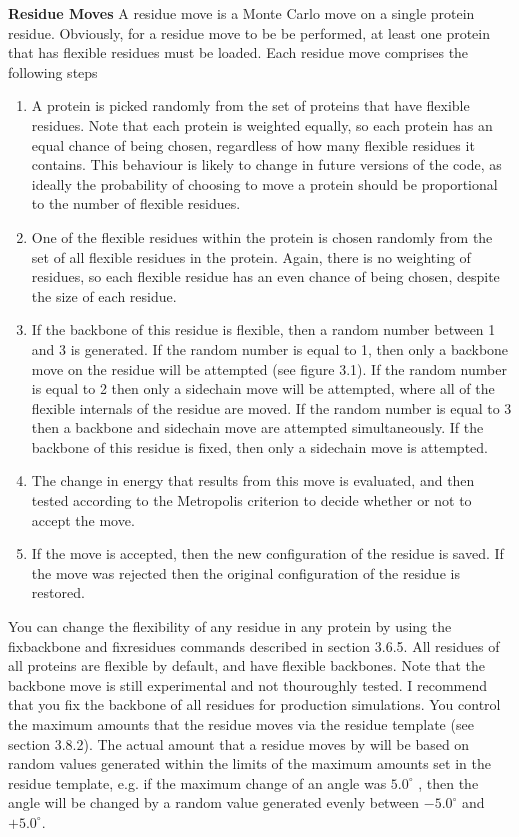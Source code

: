 \documentclass[letterpaper,10pt,english]{sphinxmanual}
\begin{document}
\textbf{Residue Moves}
A residue move is a Monte Carlo move on a single protein residue. Obviously, for a residue move to be be performed, at least one protein that has flexible residues must be loaded. Each residue move comprises the following steps
\begin{enumerate}
\item {} 
A protein is picked randomly from the set of proteins that have flexible residues. Note that each protein is weighted equally, so each protein has an equal chance of being chosen, regardless of how many flexible residues it contains. This behaviour is likely to change in future versions of the code, as ideally the probability of choosing to move a protein should be proportional to the number of flexible residues.

\item {} 
One of the flexible residues within the protein is chosen randomly from the set of all flexible residues in the protein. Again, there is no weighting of residues, so each flexible residue has an even chance of being chosen, despite the size of each residue.

\item {} 
If the backbone of this residue is flexible, then a random number between 1 and 3 is generated. If the random number is equal to 1, then only a backbone move on the residue will be attempted (see figure 3.1). If the random number is equal to 2 then only a sidechain move will be attempted, where all of the flexible internals of the residue are moved. If the random number is equal to 3 then a backbone and sidechain move are attempted simultaneously. If the backbone of this residue is fixed, then only a sidechain move is attempted.

\item {} 
The change in energy that results from this move is evaluated, and then tested according to the Metropolis criterion to decide whether or not to accept the move.

\item {} 
If the move is accepted, then the new configuration of the residue is saved. If the move was rejected then the original configuration of the residue is restored.

\end{enumerate}

You can change the flexibility of any residue in any protein by using the fixbackbone and fixresidues commands described in section 3.6.5. All residues of all proteins are flexible by default, and have flexible backbones. Note that the backbone move is still experimental and not thouroughly tested. I recommend that you fix the backbone of all residues for production simulations. You control the maximum amounts that the residue moves via the residue template (see section 3.8.2). The actual amount that a residue moves by will be based on random values generated within the limits of the maximum amounts set in the residue template, e.g. if the maximum change of an angle was \(5.0^\circ\) , then the angle will be changed by a random value generated evenly between \(-5.0^\circ\) and \(+5.0^\circ\).
\end{document}
